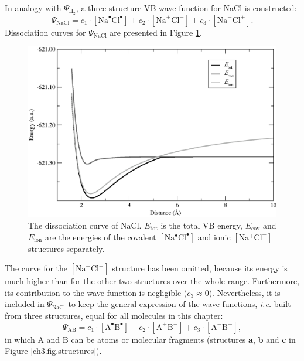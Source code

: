 In analogy with $\Psi_{\mathrm{H_2}}$, a three structure VB wave function for NaCl is constructed:
\begin{equation}
\nonumber
\Psi_{\mathrm{NaCl}} = c_1\cdot [\mathrm{Na}^\bullet \mathrm{Cl}^\bullet] + c_2 \cdot [\mathrm{Na}^{+}\mathrm{Cl}^{-}] + c_3 \cdot [\mathrm{Na}^{-}\mathrm{Cl}^{+}]. 
\end{equation}
Dissociation curves for $\Psi_{\mathrm{NaCl}}$ are presented in Figure \ref{ch3.fig.nacl_c}.
\begin{figure}[hbtp]
\begin{center}
\includegraphics[scale=0.6]{dissociation/figures/nacl_g.eps}
\end{center}
\caption{The dissociation curve of NaCl. $E_\mathrm{tot}$ is the total VB energy, $E_\mathrm{cov}$  and $E_\mathrm{ion}$ are the energies of the covalent $[\mathrm{Na^\bullet Cl^\bullet}]$ and ionic $[\mathrm{Na^{+}Cl^{-}}]$ structures separately.}
\label{ch3.fig.nacl_c}
\end{figure}
The curve for the $[\mathrm{Na}^{-}\mathrm{Cl}^{+}]$ structure has been omitted, because its energy is much higher than for the other two structures over the whole range. Furthermore, its contribution to the wave function is negligible ($c_3 \approx 0$). Nevertheless, it is included in $\Psi_{\mathrm{NaCl}}$ to keep the general expression of the wave functions, \textit{i.e.} built from three structures, equal for all molecules in this chapter:
\begin{equation}
\nonumber
\Psi_{\mathrm{AB}} = c_1\cdot [\mathrm{A}^\bullet \mathrm{B}^\bullet] + c_2 \cdot [\mathrm{A}^{+}\mathrm{B}^{-}] 
+ c_3 \cdot [\mathrm{A}^{-}\mathrm{B}^{+}],
\end{equation}
in which $\mathrm{A}$ and $\mathrm{B}$ can be atoms or molecular fragments (structures \textbf{a}, \textbf{b} and \textbf{c} in Figure \ref{ch3.fig.structures}).

